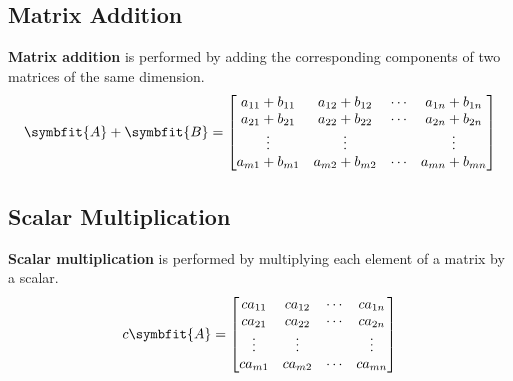 \documentclass{article}
\begin{document}
	\subsection{Matrix Addition}
	\begin{definition}
		\textbf{Matrix addition} is performed by adding the corresponding components of two matrices of the same dimension.
		\begin{equation*}
			\symbfit{A} + \symbfit{B} = \mqty[
				a_{11} + b_{11} & a_{12} + b_{12} & \cdots & a_{1n} + b_{1n} \\
				a_{21} + b_{21} & a_{22} + b_{22} & \cdots & a_{2n} + b_{2n} \\
				\vdots          & \vdots          &        & \vdots          \\
				a_{m1} + b_{m1} & a_{m2} + b_{m2} & \cdots & a_{mn} + b_{mn} \\
				]
		\end{equation*}
	\end{definition}
	\subsection{Scalar Multiplication}
	\begin{definition}
		\textbf{Scalar multiplication} is performed by multiplying each element of a matrix by a scalar. 
		\begin{equation*}
			c\symbfit{A} = \mqty[
				ca_{11} & ca_{12} & \cdots & ca_{1n} \\
				ca_{21} & ca_{22} & \cdots & ca_{2n} \\
				\vdots  & \vdots  &        & \vdots  \\
				ca_{m1} & ca_{m2} & \cdots & ca_{mn} \\
				]
		\end{equation*}
	\end{definition}
\end{document}
